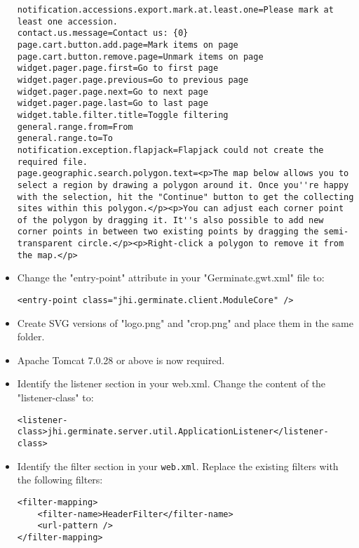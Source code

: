 \begin{itemize}
\begin{lstlisting}[style=Properties]
notification.accessions.export.mark.at.least.one=Please mark at least one accession.
contact.us.message=Contact us: {0}
page.cart.button.add.page=Mark items on page
page.cart.button.remove.page=Unmark items on page
widget.pager.page.first=Go to first page
widget.pager.page.previous=Go to previous page
widget.pager.page.next=Go to next page
widget.pager.page.last=Go to last page
widget.table.filter.title=Toggle filtering
general.range.from=From
general.range.to=To
notification.exception.flapjack=Flapjack could not create the required file.
page.geographic.search.polygon.text=<p>The map below allows you to select a region by drawing a polygon around it. Once you''re happy with the selection, hit the "Continue" button to get the collecting sites within this polygon.</p><p>You can adjust each corner point of the polygon by dragging it. It''s also possible to add new corner points in between two existing points by dragging the semi-transparent circle.</p><p>Right-click a polygon to remove it from the map.</p>
	\end{lstlisting}
	\item Change the "entry-point" attribute in your "Germinate.gwt.xml" file to:
	\begin{lstlisting}[style=Xml]
<entry-point class="jhi.germinate.client.ModuleCore" />
	\end{lstlisting}
	\item Create SVG versions of "logo.png" and "crop.png" and place them in the same folder.
	\item Apache Tomcat 7.0.28 or above is now required.
	\item Identify the listener section in your web.xml. Change the content of the "listener-class" to:
	\begin{lstlisting}[style=Xml]
<listener-class>jhi.germinate.server.util.ApplicationListener</listener-class>
	\end{lstlisting}
	\item Identify the filter section in your \texttt{web.xml}. Replace the existing filters with the following filters:
	\begin{lstlisting}[style=Xml]
<filter-mapping>
	<filter-name>HeaderFilter</filter-name>
	<url-pattern />
</filter-mapping>


\end{lstlisting}
\end{itemize}

